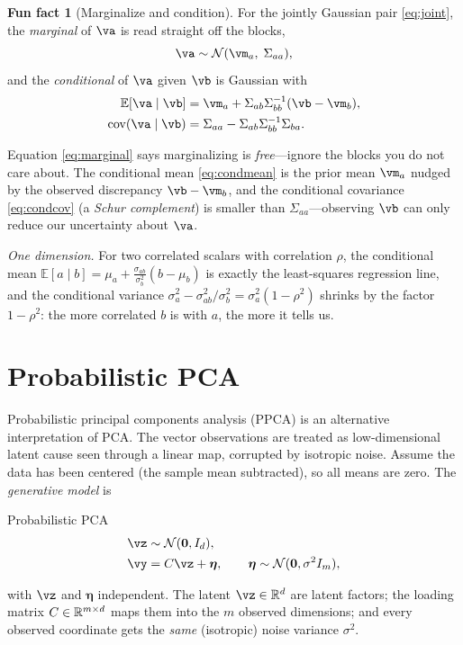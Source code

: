 \documentclass[11pt]{article}
\theoremstyle{plain}
\theoremstyle{definition}
\theoremstyle{remark}
\theoremstyle{definition}
\newtheorem{funfact}{Fun fact}
\newcommand{\E}{\mathbb{E}}
\newcommand{\veta}{\bm{\eta}}
\newcommand{\Normal}{\mathcal{N}}
\begin{document}
\begin{funfact}[Marginalize and condition]\label{fact:cond}
For the jointly Gaussian pair \eqref{eq:joint}, the \emph{marginal} of $\va$ is
read straight off the blocks,
\begin{equation}\label{eq:marginal}
    \va \sim \Normal(\vm_a,\; \Sigma_{aa}),
\end{equation}
and the \emph{conditional} of $\va$ given $\vb$ is Gaussian with
\begin{align}
    \E[\va \mid \vb] &= \vm_a + \Sigma_{ab}\Sigma_{bb}^{-1}(\vb - \vm_b),
        \label{eq:condmean}\\
    \cov(\va \mid \vb) &= \Sigma_{aa} - \Sigma_{ab}\Sigma_{bb}^{-1}\Sigma_{ba}.
        \label{eq:condcov}
\end{align}
\end{funfact}

Equation \eqref{eq:marginal} says marginalizing is \emph{free}---ignore the
blocks you do not care about. The conditional mean \eqref{eq:condmean} is the
prior mean $\vm_a$ nudged by the observed discrepancy $\vb - \vm_b$, and the
conditional covariance \eqref{eq:condcov} (a \emph{Schur complement}) is smaller
than $\Sigma_{aa}$---observing $\vb$ can only reduce our uncertainty about
$\va$.

\emph{One dimension.} For two correlated scalars with correlation $\rho$, the
conditional mean $\E[a \mid b] = \mu_a + \frac{\sigma_{ab}}{\sigma_b^2}(b -
\mu_b)$ is exactly the least-squares regression line, and the conditional
variance $\sigma_a^2 - \sigma_{ab}^2/\sigma_b^2 = \sigma_a^2(1 - \rho^2)$ shrinks
by the factor $1 - \rho^2$: the more correlated $b$ is with $a$, the more it
tells us.

\section{Probabilistic PCA}\label{sec:ppca}

Probabilistic principal components analysis (PPCA) \parencite{Tipping1999-cv} is an
alternative interpretation of PCA. The vector observations are treated as
low-dimensional latent cause seen through a linear map, corrupted by isotropic
noise. Assume the data has been centered (the sample mean subtracted), so all
means are zero. The \emph{generative model} is
\begin{genmodel}{Probabilistic PCA}
\begin{align}
    \vz &\sim \Normal(\mathbf 0, I_d), \label{eq:ppca-latent}\\
    \vy &= C\vz + \veta, \qquad \veta \sim \Normal(\mathbf 0, \sigma^2 I_m),
        \label{eq:ppca-obs}
\end{align}
\end{genmodel}
\noindent
with $\vz$ and $\veta$ independent. The latent $\vz \in \reals^d$ are
latent factors; the loading matrix $C \in \mathbb{R}^{m\times d}$ maps them into the
$m$ observed dimensions; and every observed coordinate gets the \emph{same} (isotropic)
noise variance $\sigma^2$.
\end{document}
